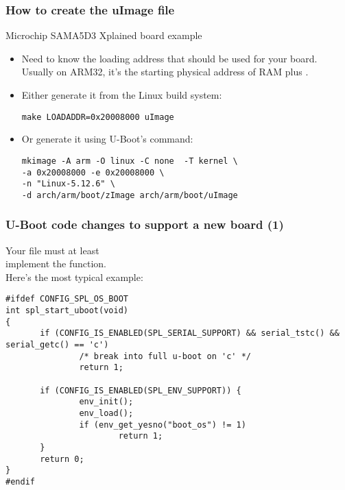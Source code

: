 \begin{frame}[fragile]
   \frametitle{How to create the uImage file}
   Microchip SAMA5D3 Xplained board example
   \begin{itemize}
      \item Need to know the loading address that should be used for
            your board. Usually on ARM32, it's the starting physical address of
            RAM plus .
      \item Either generate it from the Linux build system:\\
          \begin{block}{}
          \begin{verbatim}
make LOADADDR=0x20008000 uImage
          \end{verbatim}
          \end{block}
      \item Or generate it using U-Boot's  command:\\
          \begin{block}{}
          \begin{verbatim}
mkimage -A arm -O linux -C none  -T kernel \
-a 0x20008000 -e 0x20008000 \
-n "Linux-5.12.6" \
-d arch/arm/boot/zImage arch/arm/boot/uImage
          \end{verbatim}
          \end{block}
   \end{itemize}
\end{frame}

\begin{frame}[fragile]
\frametitle{U-Boot code changes to support a new board (1)}
\small
Your  file must at least\\
implement the \projfunc{u-boot}{spl_start_uboot} function.\\
Here's the most typical example:
\begin{block}{}
\begin{verbatim}
#ifdef CONFIG_SPL_OS_BOOT
int spl_start_uboot(void)
{
       if (CONFIG_IS_ENABLED(SPL_SERIAL_SUPPORT) && serial_tstc() && serial_getc() == 'c')
               /* break into full u-boot on 'c' */
               return 1;

       if (CONFIG_IS_ENABLED(SPL_ENV_SUPPORT)) {
               env_init();
               env_load();
               if (env_get_yesno("boot_os") != 1)
                       return 1;
       }
       return 0;
}
#endif
\end{verbatim}
\end{block}
\end{frame}

